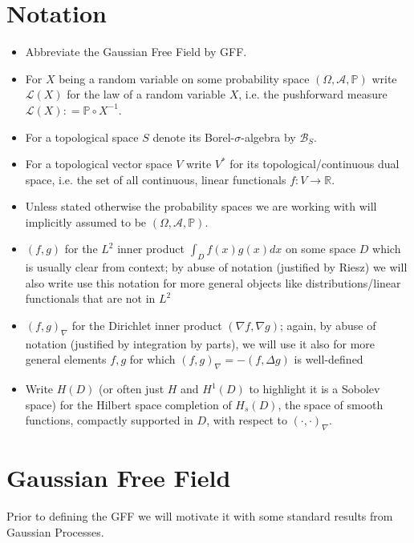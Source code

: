 \documentclass[11pt,reqno]{amsart}
\numberwithin{equation}{section}
\newcommand{\deq}{\mathrel{\mathop:}=}
\begin{document}
\section*{Notation}
\begin{itemize}
	\item Abbreviate the Gaussian Free Field by GFF.
	\item For $X$ being a random variable on some probability space $(\Omega, \mathcal A, \mathbb P)$ write $\mathcal L(X)$ for the law of a random variable $X$, i.e. the pushforward measure $\mathcal L(X)\deq \mathbb P\circ X^{-1}$.
	\item For a topological space $S$ denote its Borel-$\sigma$-algebra by $\mathcal B_S$.
	\item For a topological vector space $V$ write $V^*$ for its topological/continuous dual space, i.e. the set of all continuous, linear functionals $f:V\rightarrow\mathbb R$.
	\item Unless stated otherwise the probability spaces we are working with will implicitly assumed to be $(\Omega,\mathcal A,\mathbb P)$.
	\item $(f,g)$ for the $L^2$ inner product $\int_D f(x)g(x)dx$ on some space $D$ which is usually clear from context; by abuse of notation (justified by Riesz) we will also write use this notation for more general objects like distributions/linear functionals that are not in $L^2$
	\item $(f,g)_\nabla$ for the Dirichlet inner product $(\nabla f,\nabla g)$; again, by abuse of notation (justified by integration by parts), we will use it also for more general elements $f,g$ for which $(f,g)_\nabla = -(f,\Delta g)$ is well-defined
	\item Write $H(D)$ (or often just $H$ and $H^1(D)$ to highlight it is a Sobolev space) for the Hilbert space completion of $H_s(D)$, the space of smooth functions, compactly supported in $D$, with respect to $(\cdot,\cdot)_\nabla$.
\end{itemize}

\section{Gaussian Free Field}

Prior to defining the GFF we will motivate it with some standard results from Gaussian Processes.
\end{document}
